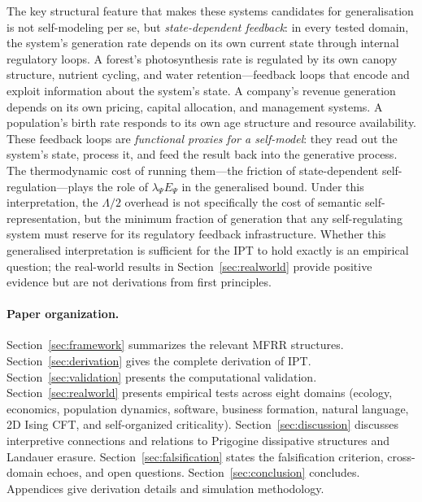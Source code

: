 \documentclass[11pt,twocolumn]{article}
\theoremstyle{remark}
\begin{document}
The key structural feature that makes these systems candidates for generalisation is not
self-modeling per se, but \emph{state-dependent feedback}: in every tested domain, the
system's generation rate depends on its own current state through internal regulatory
loops. A forest's photosynthesis rate is regulated by its own canopy structure, nutrient
cycling, and water retention---feedback loops that encode and exploit information about the
system's state. A company's revenue generation depends on its own pricing, capital allocation,
and management systems. A population's birth rate responds to its own age structure and
resource availability. These feedback loops are \emph{functional proxies for a self-model}:
they read out the system's state, process it, and feed the result back into the generative
process. The thermodynamic cost of running them---the friction of state-dependent
self-regulation---plays the role of $\lambda_\Psi E_\Psi$ in the generalised bound.
Under this interpretation, the $\Lambda/2$ overhead is not specifically the cost of
semantic self-representation, but the minimum fraction of generation that any
self-regulating system must reserve for its regulatory feedback infrastructure.
Whether this generalised interpretation is sufficient for the IPT to hold exactly
is an empirical question; the real-world results in Section~\ref{sec:realworld} provide
positive evidence but are not derivations from first principles.

\paragraph{Paper organization.}
Section~\ref{sec:framework} summarizes the relevant MFRR structures.
Section~\ref{sec:derivation} gives the complete derivation of IPT.
Section~\ref{sec:validation} presents the computational validation.
Section~\ref{sec:realworld} presents empirical tests across eight domains
(ecology, economics, population dynamics, software, business formation,
natural language, 2D Ising CFT, and self-organized criticality).
Section~\ref{sec:discussion} discusses interpretive connections and
relations to Prigogine dissipative structures and Landauer erasure.
Section~\ref{sec:falsification} states the falsification criterion,
cross-domain echoes, and open questions. Section~\ref{sec:conclusion} concludes.
Appendices give derivation details and simulation methodology.
\end{document}
